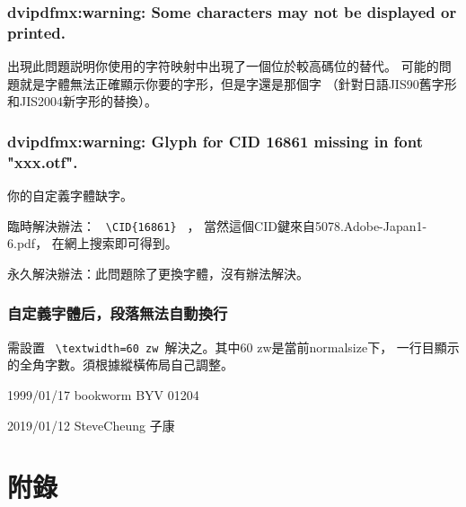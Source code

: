 \documentclass[a4,11pt,uplatex,openleft]{jsarticle}
\begin{document}
\subsubsection{ dvipdfmx:warning: Some characters may not be displayed or printed.}
出現此問題説明你使用的字符映射中出現了一個位於較高碼位的替代。
可能的問題就是字體無法正確顯示你要的字形，但是字還是那個字
（針對日語JIS90舊字形和JIS2004新字形的替換）。


\subsubsection{  dvipdfmx:warning: Glyph for CID 16861 missing in font "xxx.otf". }

\par 你的自定義字體缺字。
\par 臨時解決辦法： \verb+ \CID{16861} + ，
當然這個CID鍵來自5078.Adobe-Japan1-6.pdf，
在網上搜索即可得到。

永久解決辦法：此問題除了更換字體，沒有辦法解決。


\subsubsection{自定義字體后，段落無法自動換行}
需設置 \verb+ \textwidth=60 zw +解決之。其中60 zw是當前normalsize下，
一行目顯示的全角字數。須根據縱橫佈局自己調整。

1999/01/17 bookworm BYV 01204 

2019/01/12  SteveCheung 子康


\clearpage

\section*{附\quad 錄}
\end{document}
